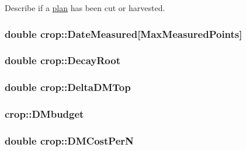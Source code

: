 Describe if a \hyperlink{classplan}{plan} has been cut or harvested. \hypertarget{classcrop_abc773778bea26210ad38d1ed7a342e24}{
\subsubsection[{DateMeasured}]{\setlength{\rightskip}{0pt plus 5cm}double {\bf crop::DateMeasured}\mbox{[}MaxMeasuredPoints\mbox{]}}}
\label{classcrop_abc773778bea26210ad38d1ed7a342e24}
\hypertarget{classcrop_afe8c6c11905d19aca8f9623180b8462f}{
\subsubsection[{DecayRoot}]{\setlength{\rightskip}{0pt plus 5cm}double {\bf crop::DecayRoot}}}
\label{classcrop_afe8c6c11905d19aca8f9623180b8462f}
\hypertarget{classcrop_a0491b172b4874adcd1b3930cb3be00fe}{
\subsubsection[{DeltaDMTop}]{\setlength{\rightskip}{0pt plus 5cm}double {\bf crop::DeltaDMTop}}}
\label{classcrop_a0491b172b4874adcd1b3930cb3be00fe}
\hypertarget{classcrop_a46844fd0540eb7627555f21afa8545e8}{
\subsubsection[{DMbudget}]{ {\bf crop::DMbudget}}}
\label{classcrop_a46844fd0540eb7627555f21afa8545e8}
\hypertarget{classcrop_af06dc09d391a57692b440c7c492dbc41}{
\subsubsection[{DMCostPerN}]{\setlength{\rightskip}{0pt plus 5cm}double {\bf crop::DMCostPerN}}}
\label{classcrop_af06dc09d391a57692b440c7c492dbc41}


